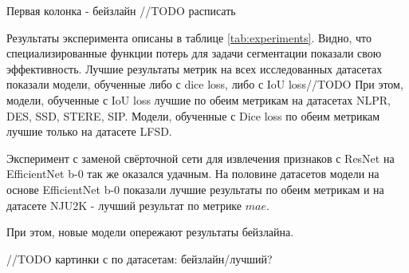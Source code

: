 Первая колонка - бейзлайн //TODO расписать

Результаты эксперимента описаны в таблице \ref{tab:experiments}. 
Видно, что специализированные функции потерь для задачи сегментации
показали свою эффективность. Лучшие результаты метрик на всех исследованных
датасетах показали модели, обученные либо с dice loss, либо с IoU loss//TODO
При этом, модели, обученные с IoU loss лучшие по обеим метрикам
на датасетах NLPR, DES, SSD, STERE, SIP. Модели, обученные с Dice loss 
по обеим метрикам лучшие только на датасете LFSD.

Эксперимент с заменой свёрточной сети для извлечения признаков с ResNet на EfficientNet b-0 
так же оказался удачным. На половине датасетов модели на основе EfficientNet b-0 показали 
лучшие результаты по обеим метрикам и на датасете NJU2K - лучший результат по метрике $mae$.

При этом, новые модели опережают результаты бейзлайна.

//TODO картинки с по датасетам: бейзлайн/лучший? 

